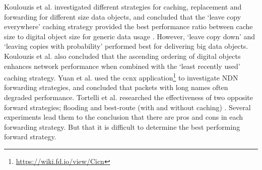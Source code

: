 \documentclass[conference]{IEEEtran}
\begin{document}
Koulouzis et al. investigated different strategies for caching, replacement and forwarding for different size data objects, and concluded that the `leave copy everywhere' caching strategy provided the best performance ratio between cache size to digital object size for generic data usage \cite{koulouzis2018information}. However, `leave copy down' and `leaving copies with probability' performed best for delivering big data objects. Koulouzis et al. also concluded that the ascending ordering of digital objects enhances network performance when combined with the `least recently used' caching strategy. Yuan et al. \cite{yuan2012scalable} used the \gls{ccnx} application\footnote{\url{https://wiki.fd.io/view/Cicn}} to investigate NDN forwarding strategies, and concluded that packets with long names often degraded performance. Tortelli et al. researched the effectiveness of two opposite forward strategies; flooding and best-route (with and without caching) \cite{tortelli2013performance}. Several experiments lead them to the conclusion that there are pros and cons in each forwarding strategy. But that it is difficult to determine the best performing forward strategy. 
\end{document}
